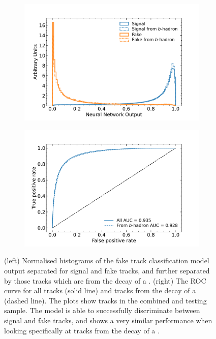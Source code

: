 \begin{figure}[!htbp]
  \centering
  \begin{subfigure}[b]{0.48\textwidth}
      \centering
      \includegraphics[width=\textwidth]{chapters/track_classifier/figs/fake_id_output.pdf}
  \end{subfigure}
  \quad
  \begin{subfigure}[b]{0.48\textwidth}
      \centering
      \includegraphics[width=\textwidth]{chapters/track_classifier/figs/fake_id_roc.pdf}
  \end{subfigure}
  \caption{
    (left) Normalised histograms of the fake track classification model output separated for signal and fake tracks, and further separated by those tracks which are from the decay of a \bhadron.
    (right) The ROC curve for all tracks (solid line) and tracks from the decay of a \bhadron (dashed line).
    The plots show tracks in the combined \ttbar and \Zprime testing sample.
    The model is able to successfully discriminate between signal and fake tracks, and shows a very similar performance when looking specifically at tracks from the decay of a \bhadron.
  }
  \label{fig:track_classifier_output_roc}
\end{figure}

